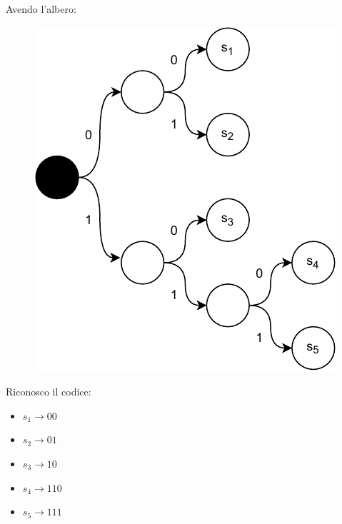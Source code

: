 \documentclass[a4paper,12pt, oneside]{book}
\begin{document}
\begin{esempio}
  Avendo l'albero:
    \begin{figure}[H]
    \centering
    \includegraphics[scale = 0.7]{img/ct4.pdf}
  \end{figure}
  Riconosco il codice:
  \begin{itemize}
    \item $s_1\to 00$
    \item $s_2\to 01$
    \item $s_3\to 10$
    \item $s_4\to 110$
    \item $s_5\to 111$
  \end{itemize}
  
\end{esempio}
\end{document}
